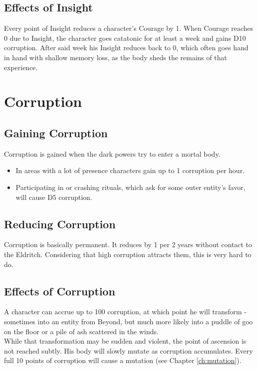\documentclass[12pt,a4paper,openany]{book}
\begin{document}
	\subsection{Effects of Insight}
	Every point of Insight reduces a character's Courage by 1.
	When Courage reaches 0 due to Insight,
		the character goes catatonic for at least a week and gains D10 corruption.
	After said week his Insight reduces back to 0,
		which often goes hand in hand with shallow memory loss,
		as the body sheds the remains of that experience.
	
	\section{Corruption}
	\subsection{Gaining Corruption}
	Corruption is gained when the dark powers try to enter a mortal body.
	\vspace{-8mm}
	\begin{itemize}
		\setlength\itemsep{-8mm}
		\item In areas with a lot of presence characters gain up to 1 corruption per hour.
		\item Participating in or crashing rituals, which ask for some outer entity's favor, will cause D5 corruption.
	\end{itemize}
	\subsection{Reducing Corruption}
	Corruption is basically permanent.
	It reduces by 1 per 2 years without contact to the Eldritch.
	Considering that high corruption attracts them, this is very hard to do.
	\subsection{Effects of Corruption}
	A character can accrue up to 100 corruption, at which point he will transform
		- sometimes into an entity from Beyond,
		but much more likely into
		a puddle of goo on the floor
		or a pile of ash scattered in the winds.
		\\%
	While that transformation may be sudden and violent,
		the point of ascension is not reached subtly.
	His body will slowly mutate as corruption accumulates.
	Every full 10 points of corruption will cause a mutation (see Chapter \ref{ch:mutation}).
	
\end{document}
